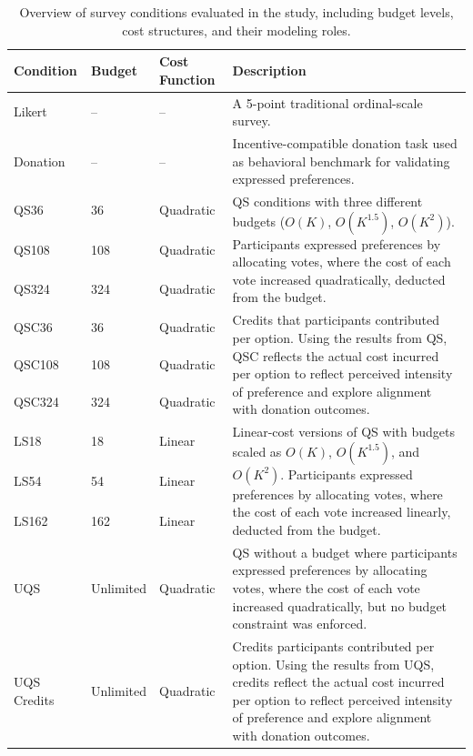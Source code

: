 \begin{table}[h]
    \centering
    \begin{tabular}{@{}lllp{9cm}@{}}
        \toprule
        \textbf{Condition} & \textbf{Budget} & \textbf{Cost Function} & \textbf{Description} \\
        \midrule
        Likert & – & – & A 5-point traditional ordinal-scale survey. \\ 
        \midrule
        Donation & – & – & Incentive-compatible donation task used as behavioral benchmark for validating expressed preferences. \\
        \midrule
        QS36   & 36   & Quadratic & \multirow{3}{9cm}{QS conditions with three different budgets ($O(K)$, $O(K^{1.5})$, $O(K^2)$). Participants expressed preferences by allocating votes, where the cost of each vote increased quadratically, deducted from the budget.} \\
        QS108  & 108  & Quadratic & \\
        QS324  & 324  & Quadratic & \\
        \midrule
        QSC36  & 36   & Quadratic & \multirow{3}{9cm}{Credits that participants contributed per option. Using the results from QS, QSC reflects the actual cost incurred per option to reflect perceived intensity of preference and explore alignment with donation outcomes.} \\
        QSC108 & 108  & Quadratic & \\
        QSC324 & 324  & Quadratic & \\
        \midrule
        LS18   & 18   & Linear    & \multirow{3}{9cm}{Linear-cost versions of QS with budgets scaled as $O(K)$, $O(K^{1.5})$, and $O(K^2)$. Participants expressed preferences by allocating votes, where the cost of each vote increased linearly, deducted from the budget.} \\
        LS54   & 54   & Linear    & \\
        LS162  & 162  & Linear    & \\
        \midrule
        UQS    & Unlimited & Quadratic & QS without a budget where participants expressed preferences by allocating votes, where the cost of each vote increased quadratically, but no budget constraint was enforced. \\
        \midrule
        UQS Credits & Unlimited & Quadratic & Credits participants contributed per option. Using the results from UQS, credits reflect the actual cost incurred per option to reflect perceived intensity of preference and explore alignment with donation outcomes. \\
        \bottomrule
    \end{tabular}
    \caption[]{Overview of survey conditions evaluated in the study, including budget levels, cost structures, and their modeling roles.}
    \label{tbl:experiment_cond}
\end{table}


